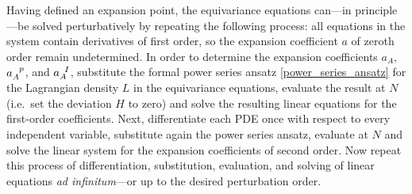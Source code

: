 Having defined an expansion point, the equivariance equations can---in principle---be solved perturbatively by repeating the following process: all equations in the system contain derivatives of first order, so the expansion coefficient $a$ of zeroth order remain undetermined. In order to determine the expansion coefficients $a_A$, $a_A^{\hphantom Ap}$, and $a_A^{\hphantom aI}$, substitute the formal power series ansatz \eqref{power_series_ansatz} for the Lagrangian density $L$ in the equivariance equations, evaluate the result at $N$ (i.e.\ set the deviation $H$ to zero) and solve the resulting linear equations for the first-order coefficients. Next, differentiate each PDE once with respect to every independent variable, substitute again the power series ansatz, evaluate at $N$ and solve the linear system for the expansion coefficients of second order. Now repeat this process of differentiation, substitution, evaluation, and solving of linear equations \emph{ad infinitum}---or up to the desired perturbation order.

